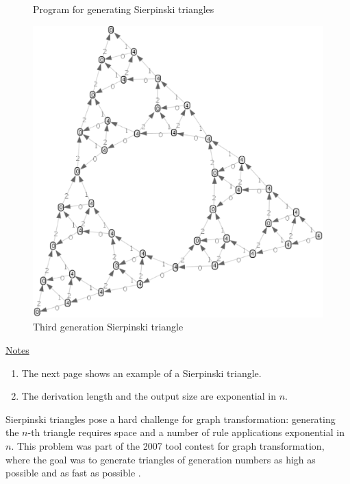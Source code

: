 \begin{figure}[p]
\begin{center}

\end{center}
\caption{Program for generating Sierpinski triangles}\label{fig:Sierpinski-program}
 \begin{center}
  \includegraphics[scale=.35,angle=-15]{sierpinski-3.eps}
 \end{center}
\vspace*{-2.5cm}
\caption{Third generation Sierpinski triangle \label{fig:sierpinski}}
\end{figure}

\ul{Notes}
\begin{enumerate}
\setlength{\itemsep}{-.5ex}
\item The next page shows an example of a Sierpinski triangle.
\item The derivation length and the output size are exponential in $n$.
\end{enumerate}

Sierpinski triangles pose a hard challenge for graph transformation: generating the $n$-th triangle requires space and a number of rule applications exponential in $n$. This problem was part of the 2007 tool contest for graph transformation, where the goal was to generate triangles of generation numbers as high as possible and as fast as possible \cite{Taentzer_et_al08a}.
